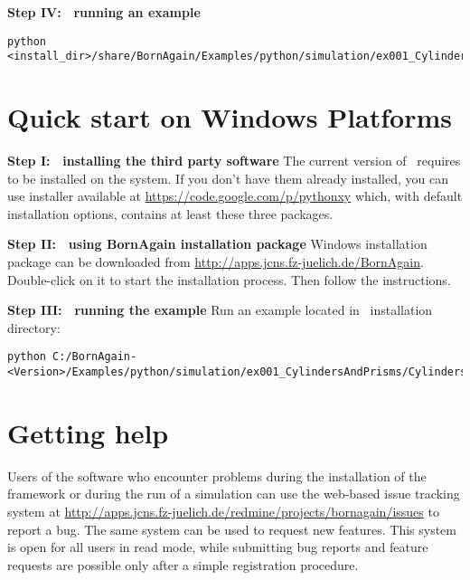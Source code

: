 \noindent
{\bf Step IV: $~$ running an example}
\begin{lstlisting}[language=shell, style=commandline]
python <install_dir>/share/BornAgain/Examples/python/simulation/ex001_CylindersAndPrisms/CylindersAndPrisms.py
\end{lstlisting}



\section{Quick start on Windows Platforms}

\noindent
{\bf Step I: $~$ installing the third party software} \newline
The current version of \BornAgain\ requires  
to be installed on the system. If you don't have them already installed,
you can use  installer available 
at \url{https://code.google.com/p/pythonxy} which, with default installation options, contains at least these three packages.
\vspace*{2mm}

\noindent
{\bf Step II: $~$ using BornAgain installation package } \newline
Windows installation package can be downloaded from \url{http://apps.jcns.fz-juelich.de/BornAgain}.
Double-click on it to start the installation process. Then follow the instructions.
\vspace*{2mm}

\noindent
{\bf Step III: $~$ running the example} \newline
Run an example located in \BornAgain\ installation directory:
\begin{lstlisting}[language=shell, style=commandline]
python C:/BornAgain-<Version>/Examples/python/simulation/ex001_CylindersAndPrisms/CylindersAndPrisms.py
\end{lstlisting}


\section{Getting help}
Users of the software who encounter problems during the installation
of the framework or during the run of a simulation can use the web-based issue tracking system
at
\url{http://apps.jcns.fz-juelich.de/redmine/projects/bornagain/issues}
to report a bug. The same system can be used to request new features.
This system is open for all users in read mode, while 
submitting bug reports and feature requests are possible only after a simple registration
procedure.






